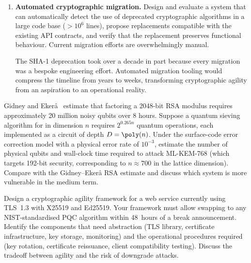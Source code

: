 \begin{enumerate}
\item \textbf{Automated cryptographic migration.}
Design and evaluate a system that can automatically detect the use of deprecated cryptographic algorithms in a large code base ($> 10^6$ lines), propose replacements compatible with the existing API contracts, and verify that the replacement preserves functional behaviour.  Current migration efforts are overwhelmingly manual.

The SHA-1 deprecation took over a decade in part because every migration was a bespoke engineering effort.  Automated migration tooling would compress the timeline from years to weeks, transforming cryptographic agility from an aspiration to an operational reality.

\end{enumerate}



\begin{prob}
\label{prob:ch15-quantum-resource}
Gidney and Eker\aa~\cite{GidneyEkera2021} estimate that factoring a 2048-bit RSA modulus requires approximately 20 million noisy qubits over 8 hours.  Suppose a quantum sieving algorithm for \svp{} in dimension $n$ requires $2^{0.265n}$ quantum operations, each implemented as a circuit of depth $D = \poly(n)$.  Under the surface-code error correction model with a physical error rate of $10^{-3}$, estimate the number of physical qubits and wall-clock time required to attack ML-KEM-768 (which targets 192-bit security, corresponding to $n \approx 700$ in the lattice dimension).  Compare with the Gidney--Eker\aa{} RSA estimate and discuss which system is more vulnerable in the medium term.
\end{prob}

\begin{prob}
\label{prob:ch15-agility}
Design a cryptographic agility framework for a web service currently using TLS~1.3 with X25519 and Ed25519.  Your framework must allow swapping to any NIST-standardised PQC algorithm within 48~hours of a break announcement.  Identify the components that need abstraction (TLS library, certificate infrastructure, key storage, monitoring) and the operational procedures required (key rotation, certificate reissuance, client compatibility testing).  Discuss the tradeoff between agility and the risk of downgrade attacks.
\end{prob}

